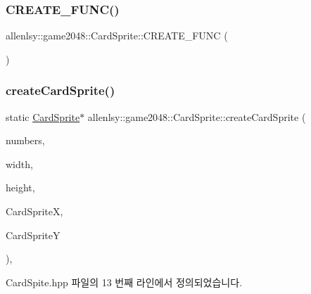 \subsubsection{\texorpdfstring{C\+R\+E\+A\+T\+E\+\_\+\+F\+U\+N\+C()}{CREATE\_FUNC()}}
{\footnotesize\ttfamily allenlsy\+::game2048\+::\+Card\+Sprite\+::\+C\+R\+E\+A\+T\+E\+\_\+\+F\+U\+NC (\begin{DoxyParamCaption}\item[{\hyperlink{classallenlsy_1_1game2048_1_1_card_sprite}{Card\+Sprite}}]{ }\end{DoxyParamCaption})}

\mbox{\label{classallenlsy_1_1game2048_1_1_card_sprite_a3a14745470040dfb933397ccb83344d7}} 
\subsubsection{\texorpdfstring{create\+Card\+Sprite()}{createCardSprite()}}
{\footnotesize\ttfamily static \hyperlink{classallenlsy_1_1game2048_1_1_card_sprite}{Card\+Sprite}$\ast$ allenlsy\+::game2048\+::\+Card\+Sprite\+::create\+Card\+Sprite (\begin{DoxyParamCaption}\item[{int}]{numbers,  }\item[{int}]{width,  }\item[{int}]{height,  }\item[{float}]{Card\+SpriteX,  }\item[{float}]{Card\+SpriteY }\end{DoxyParamCaption})\hspace{0.3cm}{\ttfamily [inline]}, {\ttfamily [static]}}



Card\+Spite.\+hpp 파일의 13 번째 라인에서 정의되었습니다.

